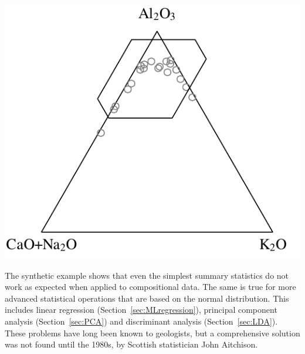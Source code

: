 \noindent\begin{minipage}[t][][b]{.4\textwidth}
\includegraphics[]{../figures/ACNKnaive.pdf}\medskip
\end{minipage}
\begin{minipage}[t][][t]{.6\textwidth}
  \label{fig:ACNKnaive}
\end{minipage}

The synthetic example shows that even the simplest summary statistics
do not work as expected when applied to compositional data.  The same
is true for more advanced statistical operations that are based on the
normal distribution. This includes linear regression
(Section~\ref{sec:MLregression}), principal component analysis
(Section~\ref{sec:PCA}) and discriminant analysis
(Section~\ref{sec:LDA}). These problems have long been known to
geologists, but a comprehensive solution was not found until the
1980s, by Scottish statistician John Aitchison.\medskip

